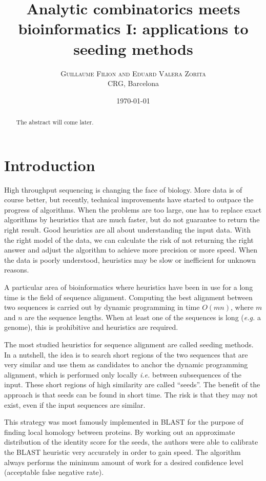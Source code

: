 \documentclass{article}
\title{Analytic combinatorics meets bioinformatics I: applications to
seeding methods}
\author{
\textsc{Guillaume Filion and Eduard Valera Zorita} \\ [1ex]
\normalsize CRG, Barcelona
}
\date{\today}
\begin{document}
\maketitle

\begin{abstract}
The abstract will come later.
\end{abstract}



\section{Introduction}

High throughput sequencing is changing the face of biology. More data is
of course better, but recently, technical improvements have started to
outpace the progress of algorithms. When the problems are too large,
one has to replace exact algorithms by heuristics that are much faster,
but do not guarantee to return the right result. Good heuristics are all
about understanding the input data. With the right model of the data, we
can calculate the risk of not returning the right answer and adjust the
algorithm to achieve more precision or more speed. When the data is poorly
understood, heuristics may be slow or inefficient for unknown reasons.

A particular area of bioinformatics where heuristics have been in use for
a long time is the field of sequence alignment. Computing the best
alignment between two sequences is carried out by dynamic programming in
time $O(mn)$, where $m$ and $n$ are the sequence lengths. When at least
one of the sequences is long (\textit{e.g.} a genome), this is prohibitive
and heuristics are required.

The most studied heuristics for sequence alignment are called seeding
methods. In a nutshell, the idea is to search short regions of the two
sequences that are very similar and use them as candidates to anchor the
dynamic programming alignment, which is performed only locally
\textit{i.e.} between subsequences of the input. These short regions of
high similarity are called ``seeds''. The benefit of the approach is that
seeds can be found in short time. The risk is that they may not exist,
even if the input sequences are similar.

This strategy was most famously implemented in BLAST for the purpose of
finding local homology between proteins. By working out an approximate
distribution of the identity score for the seeds, the authors were able to
calibrate the BLAST heuristic very accurately in order to gain speed. The
algorithm always performs the minimum amount of work for a desired
confidence level (acceptable false negative rate).
\end{document}
